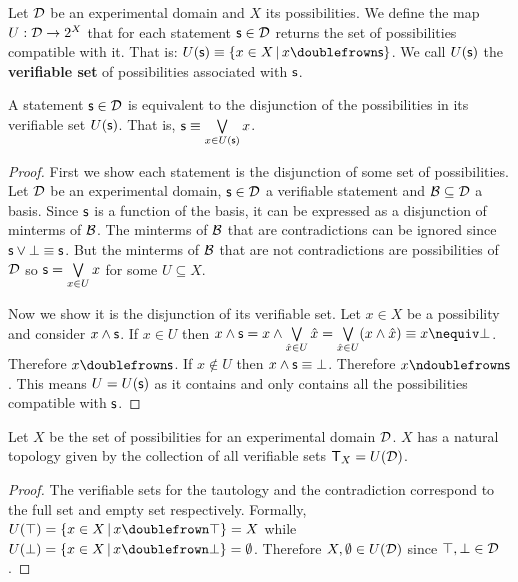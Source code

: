 \documentclass[11pt,letterpaper,fleqn]{memoir} %
\begin{document}
\begin{mathSection}
	
\begin{defn}
	Let $\mathcal{D}$ be an experimental domain and $X$ its possibilities. We define the map $U : \mathcal{D} \rightarrow 2^X$ that for each statement $\mathsf{s} \in \mathcal{D}$ returns the set of possibilities compatible with it. That is: $U(\obs)\equiv\{ x \in X \, | \, x \comp \obs\}$. We call $U(\mathsf{s})$ the \textbf{verifiable set} of possibilities associated with $\mathsf{s}$.
\end{defn}

\begin{prop}
	A statement $\mathsf{s} \in \mathcal{D}$ is equivalent to the disjunction of the possibilities in its verifiable set $U(\mathsf{s})$. That is, $\mathsf{s} \equiv \bigvee\limits_{x \in U(\mathsf{s})} x$.
\end{prop}
\begin{proof}
	First we show each statement is the disjunction of some set of possibilities. Let $\mathcal{D}$ be an experimental domain, $\mathsf{s} \in \mathcal{D}$ a verifiable statement and $\mathcal{B} \subseteq \mathcal{D}$ a basis. Since $\mathsf{s}$ is a function of the basis, it can be expressed as a disjunction of minterms of $\mathcal{B}$. The minterms of $\mathcal{B}$ that are contradictions can be ignored since $\mathsf{s} \vee \bot \equiv \mathsf{s}$. But the minterms of $\mathcal{B}$ that are not contradictions are possibilities of $\mathcal{D}$ so $\mathsf{s}=\bigvee\limits_{x \in U} x$ for some $U \subseteq X$.
	
	Now we show it is the disjunction of its verifiable set. Let $x \in X$ be a possibility and consider $x \wedge \mathsf{s}$. If $x\in U$ then $x \AND \obs = x \AND \bigOR\limits_{\hat{x} \in U} \hat{x} = \bigOR\limits_{\hat{x} \in U} ( x \AND \hat{x}) \equiv x \nequiv \contradiction$. Therefore $x \comp \obs$. If $x \notin U$ then $x \wedge \mathsf{s} \equiv \bot$. Therefore $x \ncomp \obs$. This means $U=U(\mathsf{s})$ as it contains and only contains all the possibilities compatible with $\mathsf{s}$.
\end{proof}

\begin{prop}
	Let $X$ be the set of possibilities for an experimental domain $\mathcal{D}$. $X$ has a natural topology given by the collection of all verifiable sets $\mathsf{T}_X=U(\mathcal{D})$.
\end{prop}

\begin{proof}
	The verifiable sets for the tautology and the contradiction correspond to the full set and empty set respectively. Formally, $U(\tautology) = \{ x \in X \, | \, x \comp \tautology\} = X$ while $U(\contradiction) = \{ x \in X \, | \, x \comp \contradiction\} = \emptyset$. Therefore $X, \emptyset \in U(\mathcal{D})$ since $\top, \bot \in \mathcal{D}$.


\end{proof}
\end{mathSection}
\end{document}
